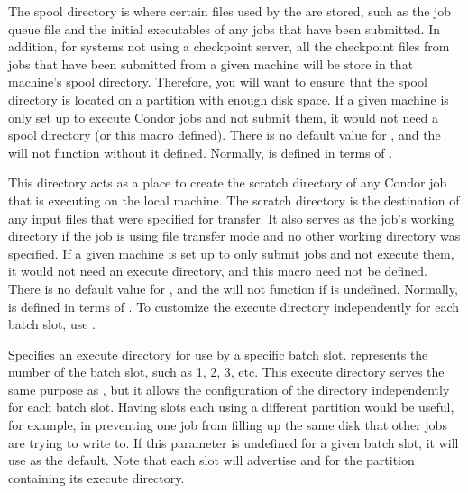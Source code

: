 \begin{description}
\label{param:Spool}
\item[\Macro{SPOOL}]
  The spool directory is where
  certain files used by the  are stored, such as the
  job queue file and the initial executables of any jobs that have
  been submitted.  In addition, for systems not using a checkpoint
  server, all the checkpoint files from jobs that have been submitted
  from a given machine will be store in that machine's spool
  directory.  Therefore, you will want to ensure that the spool
  directory is located on a partition with enough disk space.  If a
  given machine is only set up to execute Condor jobs and not submit
  them, it would not need a spool directory (or this macro defined).
  There is no default value for , and the 
  will not function without it  defined.  Normally,
   is defined in terms of .
  
\label{param:Execute}
\item[\Macro{EXECUTE}]
  This directory acts as
  a place to create the scratch directory of any Condor job that is executing
  on
  the local machine.  The scratch directory is the destination of
  any input files that were specified for transfer.  It also serves
  as the job's working directory if the job is using file transfer
  mode and no other working directory was specified.
  If a given machine is set up to only submit
  jobs and not execute them, it would not need an execute directory,
  and this macro need not be defined.  There is no default value for
  , and the  will not function if
   is undefined.  Normally,  is
  defined in terms of .  To customize the execute
  directory independently for each batch slot, use .

\label{param:SlotNExecute}
\item[\Macro{SLOT<N>\_EXECUTE}]
  Specifies an
  execute directory for use by a specific batch slot.
   represents the number of the batch slot, such as 1, 2, 3, etc.
  This execute directory serves the same purpose as , but it
  allows the configuration of the directory independently for each batch
  slot.  Having slots each using a different partition would be
  useful, for example, in preventing one job from filling up the same
  disk that other jobs are trying to write to.  If this parameter is
  undefined for a given batch slot, it will use  as
  the default.  Note that each slot will advertise 
  and  for the partition containing its execute
  directory.


\end{description}
